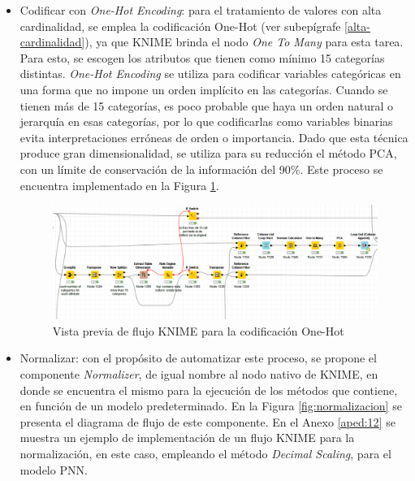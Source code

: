 \begin{itemize}

	\item Codificar con \textit{One-Hot Encoding}: para el tratamiento de valores con alta cardinalidad, se emplea la codificación One-Hot (ver subepígrafe \ref{alta-cardinalidad}), ya que KNIME brinda el nodo \textit{One To Many} para esta tarea. Para esto, se escogen los atributos que tienen como mínimo 15 categorías distintas. \textit{One-Hot Encoding} se utiliza para codificar variables categóricas en una forma que no impone un orden implícito en las categorías. Cuando se tienen más de 15 categorías, es poco probable que haya un orden natural o jerarquía en esas categorías, por lo que codificarlas como variables binarias evita interpretaciones erróneas de orden o importancia. Dado que esta técnica produce gran dimensionalidad, se utiliza para su reducción el método PCA, con un límite de conservación de la información del 90\%. Este proceso se encuentra implementado en la Figura \ref{fig:one-hot-flujo}.
	
	\begin{figure}[H]
		\centering
		\includegraphics[width=1\linewidth]{"figuras/capi 2/preprocesado/one-hot-flujo"}
		\caption{Vista previa de flujo KNIME para la codificación One-Hot}
		\label{fig:one-hot-flujo}
	\end{figure}
	
	\item Normalizar: con el propósito de automatizar este proceso, se propone el componente \textit{Normalizer}, de igual nombre al nodo nativo de KNIME, en donde se encuentra el mismo para la ejecución de los métodos que contiene, en función de un modelo predeterminado. En la Figura \ref{fig:normalizacion} se presenta el diagrama de flujo de este componente. En el Anexo \ref{aped:12} se muestra un ejemplo de implementación de un flujo KNIME para la normalización, en este caso, empleando el método \textit{Decimal Scaling}, para el modelo PNN.

\end{itemize}

